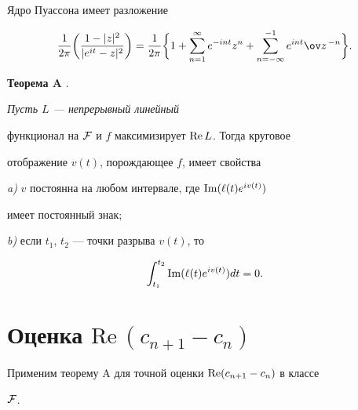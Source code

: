 Ядро Пуассона имеет разложение 


\begin{equation} 


\frac{1}{2\pi}\bigg(


\frac{1-|z|^2}{|e^{it}-z|^2}\bigg)=\frac{1}{2\pi}\bigg\{1+ 


\sum^\infty_{n=1}e^{-int}z^n+\sum^{-1}_{n=-\infty} 


e^{int}\ov z^{\,-n}\bigg\}.\end{equation} 


 


{\bf Теорема A} \cite{1}. {\it Пусть $L$ --- непрерывный линейный 


функционал на $\cal F$ и $f$ максимизирует $\operatorname{Re} L$. Тогда круговое 


отображение $v(t)$, порождающее $f$, имеет свойства 


 


{\em a)} $v$ постоянна на любом интервале, где $\operatorname{Im}(\ell(t)e^{iv(t)})$ 


имеет постоянный знак$;$ 


 


{\em b)} если $t_1$, $t_2$ --- точки разрыва $v(t)$, то 


$$ 


\int^{t_2}_{t_1}\im(\ell(t)e^{iv(t)})dt=0. 


$$ 


} 


 


\section{Оценка ${\mathrm{Re}}\,(c_{n+1}-c_n)$} 


 


Применим теорему A для точной оценки $\operatorname{Re}(c_{n+1}-c_n)$ в классе 


$\cal F$. 


 


